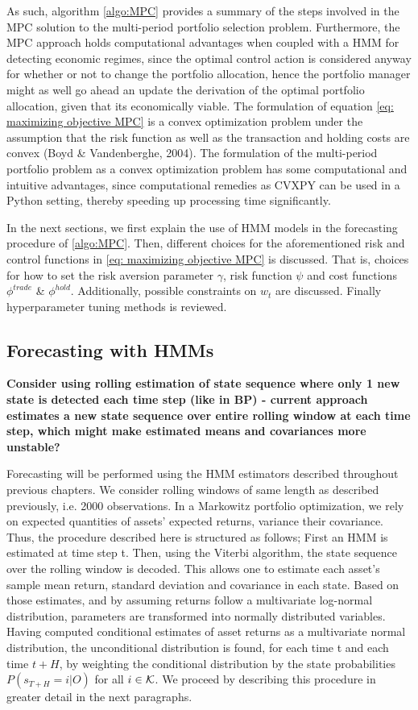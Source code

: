As such, algorithm \ref{algo:MPC} provides a summary of the steps involved in the MPC solution to the multi-period portfolio selection problem. Furthermore, the MPC approach holds computational advantages when coupled with a HMM for detecting economic regimes, since the optimal control action is considered anyway for whether or not to change the portfolio allocation, hence the portfolio manager might as well go ahead an update the derivation of the optimal portfolio allocation, given that its economically viable. The formulation of equation \ref{eq: maximizing objective MPC} is a convex optimization problem under the assumption that the risk function as well as the transaction and holding costs are convex (Boyd \& Vandenberghe, 2004). The formulation of the multi-period portfolio problem as a convex optimization problem has some computational and intuitive advantages, since computational remedies as CVXPY can be used in a Python setting, thereby speeding up processing time significantly.

In the next sections, we first explain the use of HMM models in the forecasting procedure of \cref{algo:MPC}. Then, different choices for the aforementioned risk and control functions in \cref{eq: maximizing objective MPC} is discussed. That is, choices for how to set the risk aversion parameter $\gamma$, risk function $\psi$ and cost functions $\phi^{trade}$ \& $\phi^{hold}$. Additionally, possible constraints on $w_t$ are discussed. Finally hyperparameter tuning methods is reviewed.

\subsection{Forecasting with HMMs}
\label{section: forecasting MPC HMM}

\textbf{Consider using rolling estimation of state sequence where only 1 new state is detected each time step (like in BP) - current approach estimates a new state sequence over entire rolling window at each time step, which might make estimated means and covariances more unstable?}

Forecasting will be performed using the HMM estimators described throughout previous chapters. We consider rolling windows of same length as described previously, i.e. 2000 observations. In a Markowitz portfolio optimization, we rely on expected quantities of assets' expected returns, variance their covariance. Thus, the procedure described here is structured as follows; First an HMM is estimated at time step t. Then, using the Viterbi algorithm, the state sequence over the rolling window is decoded. This allows one to estimate each asset's sample mean return, standard deviation and covariance in each state. Based on those estimates, and by assuming returns follow a multivariate log-normal distribution, parameters are transformed into normally distributed variables. Having computed conditional estimates of asset returns as a multivariate normal distribution, the unconditional distribution is found, for each time t and each time $t+H$, by weighting the conditional distribution by the state probabilities $P(s_{T+H}=i | O)$ for all $i\in\operatorname{\mathcal{K}}$. We proceed by describing this procedure in greater detail in the next paragraphs.

